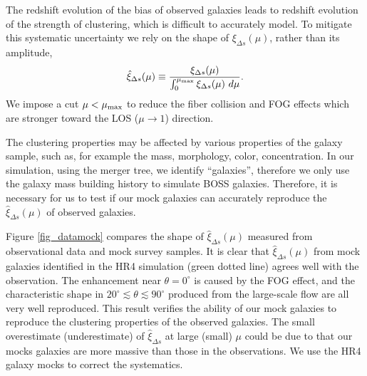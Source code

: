 \documentclass[iop]{emulateapj}
\begin{document}
The redshift evolution of the bias of observed galaxies leads to redshift evolution of the strength of clustering,
which is difficult to accurately model.
To mitigate this systematic uncertainty we rely on the shape of $\xi_{\Delta s}(\mu)$, rather than its amplitude,
\begin{equation}\label{eq:norm}
 \hat\xi_{\Delta s}(\mu) \equiv \frac{\xi_{\Delta s}(\mu)}{\int_{0}^{\mu_{\rm max}}\xi_{\Delta s}(\mu)\ d\mu}.
\end{equation}
We impose a cut $\mu<\mu_{\rm max}$ to reduce the fiber collision and FOG effects which are stronger toward the LOS ($\mu\rightarrow1$) direction.



The clustering properties may be affected by various properties of the galaxy sample, 
such as, for example the mass, morphology, color, concentration. 
In our simulation, using the merger tree, 
we identify ``galaxies'', therefore we only use the galaxy mass building history to simulate BOSS galaxies. 
Therefore, it is necessary for us to test if our mock galaxies can accurately 
reproduce the $\hat\xi_{\Delta s}(\mu)$ of observed galaxies.


Figure \ref{fig_datamock}  compares the shape of $\hat\xi_{\Delta s}(\mu)$ measured from observational data and mock survey samples.
It is clear that $\hat \xi_{\Delta s}(\mu)$ from mock galaxies identified in the HR4 simulation (green dotted line) agrees well with the observation.
The enhancement near $\theta=0^\circ$ is caused by the FOG effect,
and the characteristic shape in $20^\circ\lesssim\theta\lesssim90^\circ$ 
produced from the large-scale flow
are all very well reproduced.
This result verifies the ability of our mock galaxies to reproduce the clustering properties of the observed galaxies.
The small overestimate (underestimate) of $\hat\xi_{\Delta s}$ at large (small) $\mu$ could be due to 
that our mocks galaxies are more massive than those in the observations.
We use the HR4 galaxy mocks to correct the systematics.
\end{document}
